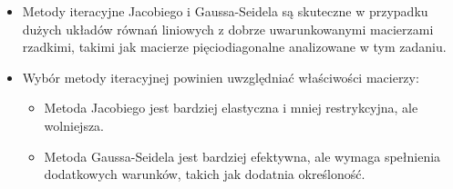 \documentclass[a4paper,12pt]{article}
\begin{document}
\begin{itemize}
    \item Metody iteracyjne Jacobiego i Gaussa-Seidela są skuteczne w przypadku dużych układów równań liniowych z dobrze uwarunkowanymi macierzami rzadkimi, takimi jak macierze pięciodiagonalne analizowane w tym zadaniu.
    \item Wybór metody iteracyjnej powinien uwzględniać właściwości macierzy:
    \begin{itemize}
        \item Metoda Jacobiego jest bardziej elastyczna i mniej restrykcyjna, ale wolniejsza.
        \item Metoda Gaussa-Seidela jest bardziej efektywna, ale wymaga spełnienia dodatkowych warunków, takich jak dodatnia określoność.
    \end{itemize}
\end{itemize}
\end{document}
